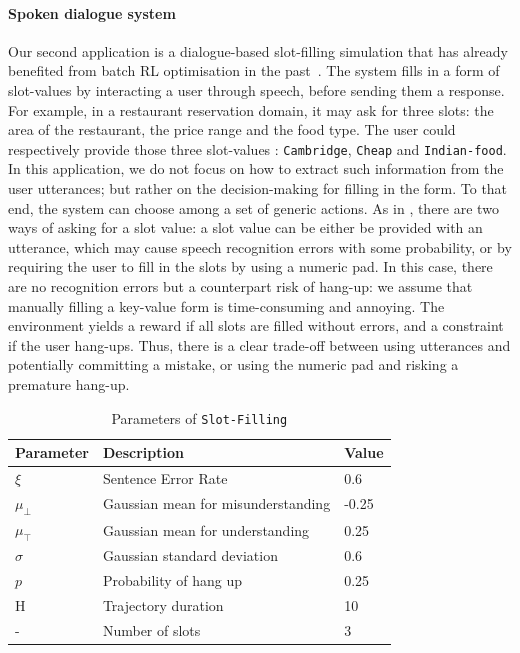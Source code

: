 \paragraph{Spoken dialogue system}
Our second application is a dialogue-based slot-filling simulation that has already benefited from batch RL optimisation in the past~\citep{Li2009ReinforcementLF,chandramohan2010optimizing,pietquin2011sample}. The system fills in a form of slot-values by interacting a user through speech, before sending them a response. For example, in a restaurant reservation domain, it may ask for three slots: the area of the restaurant, the price range and the food type. The user could respectively provide those three slot-values : \texttt{Cambridge}, \texttt{Cheap} and \texttt{Indian-food}. In this application, we do not focus on how to extract such information from the user utterances; but rather on the decision-making for filling in the form. To that end, the system can choose among a set of generic actions. As in \citep{carrara2018safe}, there are two ways of asking for a slot value: a slot value can be either be provided with an utterance, which may cause speech recognition errors with some probability, or by requiring the user to fill in the slots by using a numeric pad. In this case, there are no recognition errors but a counterpart risk of hang-up: we assume that manually filling a key-value form is time-consuming and annoying. The environment yields a reward if all slots are filled without errors, and a constraint if the user hang-ups. Thus, there is a clear trade-off between using utterances and potentially committing a mistake, or using the numeric pad and risking a premature hang-up.

\begin{table}[ht!]
    \centering
    \begin{tabular}{lll}
        \toprule
        Parameter & Description & Value\tabularnewline
        \midrule
        $\xi$ & Sentence Error Rate & 0.6\tabularnewline
        $\mu_{\bot}$& Gaussian mean for misunderstanding & -0.25\tabularnewline
        $\mu_{\top}$& Gaussian mean for understanding & 0.25\tabularnewline
        $\sigma$& Gaussian standard deviation & 0.6\tabularnewline
        $p$& Probability of hang up & 0.25\tabularnewline
        H & Trajectory duration & 10\tabularnewline
        - & Number of slots & 3\tabularnewline
        \bottomrule
    \end{tabular}
    \caption{Parameters of \texttt{Slot-Filling}}
    \label{tab:param-slot-filling}
\end{table}

